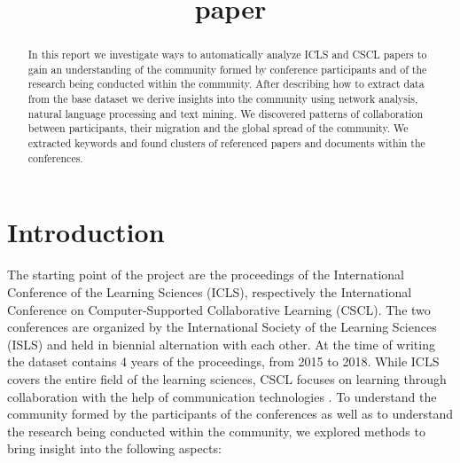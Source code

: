 \documentclass[article,twocolumn]{IEEEtran}
\title{paper}
\begin{document}
    
    
    
\renewcommand{\figurename}{Figure}
\captionsetup{labelformat=simple}\title{   }
\author{
}
\maketitle

    
    

    

\begin{abstract}
    In this report we investigate ways to automatically analyze ICLS and
CSCL papers to gain an understanding of the community formed by
conference participants and of the research being conducted within the
community. After describing how to extract data from the base dataset we
derive insights into the community using network analysis, natural
language processing and text mining. We discovered patterns of
collaboration between participants, their migration and the global
spread of the community. We extracted keywords and found clusters of
referenced papers and documents within the conferences.
\end{abstract}
    \hypertarget{introduction}{%
\section{Introduction}\label{introduction}}

The starting point of the project are the proceedings of the
International Conference of the Learning Sciences (ICLS), respectively
the International Conference on Computer-Supported Collaborative
Learning (CSCL). The two conferences are organized by the International
Society of the Learning Sciences (ISLS) and held in biennial alternation
with each other. At the time of writing the dataset contains 4 years of
the proceedings, from 2015 to 2018. While ICLS covers the entire field
of the learning sciences, CSCL focuses on learning through collaboration
with the help of communication technologies \cite{ICLS}. To understand
the community formed by the participants of the conferences as well as
to understand the research being conducted within the community, we
explored methods to bring insight into the following aspects:
\end{document}
